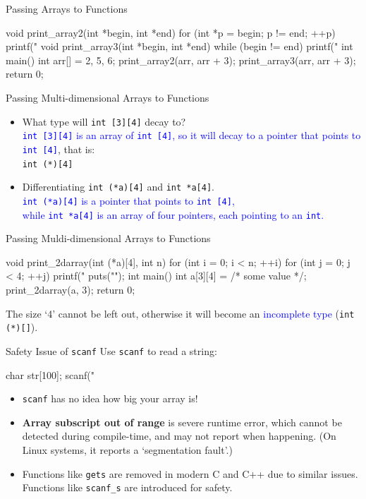 \documentclass{beamer}
\newcommand{\blue}[1]{\textcolor{blue}{#1}}
\newcommand{\ttt}[1]{\texttt{#1}}
\begin{document}
\begin{frame}[fragile]{Passing Arrays to Functions}
	\begin{cpp}
void print_array2(int *begin, int *end) {
  for (int *p = begin; p != end; ++p)
    printf("%
}
void print_array3(int *begin, int *end) {
  while (begin != end)
    printf("%
}
int main() {
  int arr[] = {2, 5, 6};
  print_array2(arr, arr + 3);
  print_array3(arr, arr + 3);
  return 0;
}
	\end{cpp}
\end{frame}

\begin{frame}[fragile]{Passing Multi-dimensional Arrays to Functions}
	\begin{itemize}
		\item What type will \ttt{int [3][4]} decay to?\\
		\pause
		\blue{\ttt{int [3][4]} is an array of \ttt{int [4]}, so it will decay to a pointer that points to \ttt{int [4]}}, that is:\\
		\ttt{int (*)[4]}
		\pause
		\item Differentiating \ttt{int (*a)[4]} and \ttt{int *a[4]}.\\
		\blue{\ttt{int (*a)[4]} is a pointer that points to \ttt{int [4]},\\
		while \ttt{int *a[4]} is an array of four pointers, each pointing to an \ttt{int}.}
	\end{itemize}
\end{frame}

\begin{frame}[fragile]{Passing Muldi-dimensional Arrays to Functions}
	\begin{cpp}
void print_2darray(int (*a)[4], int n) {
  for (int i = 0; i < n; ++i) {
    for (int j = 0; j < 4; ++j)
      printf("%
    puts("");
  }
}
int main() {
  int a[3][4] = /* some value */;
  print_2darray(a, 3);
  return 0;
}
	\end{cpp}
	The size `4' cannot be left out, otherwise it will become an \blue{incomplete type} (\ttt{int (*)[]}).
\end{frame}

\begin{frame}[fragile]{Safety Issue of \ttt{scanf}}
	Use \ttt{scanf} to read a string:
	\begin{cpp}
char str[100];
scanf("%
	\end{cpp}
	\pause
	\begin{itemize}
		\item \ttt{scanf} has no idea how big your array is!
		\item \textbf{Array subscript out of range} is severe runtime error, which cannot be detected during compile-time, and may not report when happening. (On Linux systems, it reports a `segmentation fault'.)
		\pause
		\item Functions like \ttt{gets} are removed in modern C and C++ due to similar issues. Functions like \ttt{scanf\_s} are introduced for safety.
	\end{itemize}
\end{frame}
\end{document}
